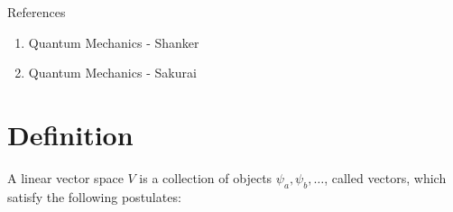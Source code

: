 References
\begin{enumerate}
	\item 
	Quantum Mechanics	-	Shanker
	
	\item
	Quantum Mechanics	- Sakurai
\end{enumerate}

\section{Definition}
A linear vector space $V$ is a collection of objects $\psi_a, \psi_b, \ldots$, called vectors, which satisfy the following postulates:
